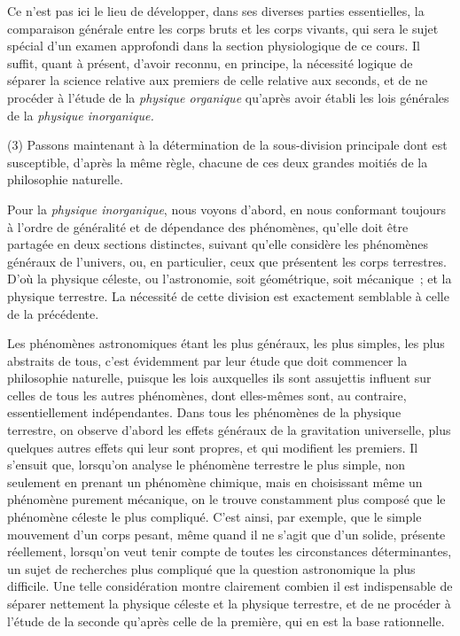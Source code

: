 \documentclass[french,twoside]{book} %
\begin{document}
Ce n’est pas ici le lieu de développer, dans ses diverses parties essentielles, la comparaison générale entre les corps bruts et les corps vivants, qui sera le sujet spécial d’un examen approfondi dans la section physiologique de ce cours. Il suffit, quant à présent, d’avoir reconnu, en principe, la nécessité logique de séparer la science relative aux premiers de celle relative aux seconds, et de ne procéder à l’étude de la {\itshape physique organique} qu’après avoir établi les lois générales de la {\itshape physique inorganique.}\par
(3) Passons maintenant à la détermination de la sous-division principale dont est susceptible, d’après la même règle, chacune de ces deux grandes moitiés de la philosophie naturelle.\par
Pour la {\itshape physique inorganique}, nous voyons d’abord, en nous conformant toujours à l’ordre de généralité et de dépendance des phénomènes, qu’elle doit être partagée en deux sections distinctes, suivant qu’elle considère les phénomènes généraux de l’univers, ou, en particulier, ceux que présentent les corps terrestres. D’où la physique céleste, ou l’astronomie, soit géométrique, soit mécanique ; et la physique terrestre. La nécessité de cette division est exactement semblable à celle de la précédente.\par
Les phénomènes astronomiques étant les plus généraux, les plus simples, les plus abstraits de tous, c’est évidemment par leur étude que doit commencer la philosophie naturelle, puisque les lois auxquelles ils sont assujettis influent sur celles de tous les autres phénomènes, dont elles-mêmes sont, au contraire, essentiellement indépendantes. Dans tous les phénomènes de la physique terrestre, on observe d’abord les effets généraux de la gravitation universelle, plus quelques autres effets qui leur sont propres, et qui modifient les premiers. Il s’ensuit que, lorsqu’on analyse le phénomène terrestre le plus simple, non seulement en prenant un phénomène chimique, mais en choisissant même un phénomène purement mécanique, on le trouve constamment plus composé que le phénomène céleste le plus compliqué. C’est ainsi, par exemple, que le simple mouvement d’un corps pesant, même quand il ne s’agit que d’un solide, présente réellement, lorsqu’on veut tenir compte de toutes les circonstances déterminantes, un sujet de recherches plus compliqué que la question astronomique la plus difficile. Une telle considération montre clairement combien il est indispensable de séparer nettement la physique céleste et la physique terrestre, et de ne procéder à l’étude de la seconde qu’après celle de la première, qui en est la base rationnelle.\par
\end{document}
